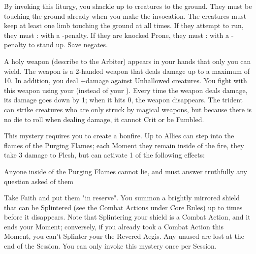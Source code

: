 {By invoking this liturgy, you shackle up to \DICE creatures to the ground.  They must be touching the ground already when you make the invocation.  The creatures must keep at least one limb touching the ground at all times.  If they attempt to run, they must \RB : \DEX with a -\DICE penalty.  If they are knocked Prone, they must \RB : \VIG with a -\DICE penalty to stand up.  Save negates.

\MYSTERY [
  Name = Holy Weapon,
  Link = arcana-mystery-holy-weapon,
  Paradigm = Force,
  Save = n/a,
  Duration = Session,
  Target = Self
]

A holy weapon (describe to the Arbiter) appears in your hands that only you can wield.  The weapon is a 2-handed weapon that deals \DICE damage up to a maximum of 10.  In addition, you deal +\DICE damage against Unhallowed creatures. You fight with this weapon using your \FOC (instead of your \VIG). Every time the weapon deals damage, its damage goes down by 1; when it hits 0, the weapon disappears.  The trident can strike creatures who are only struck by magical weapons, but because there is no die to roll when dealing damage, it cannot Crit or be Fumbled. 

\MYSTERY [
  Name = Purging Fire,
  Link = arcana-mystery-purging-fire,
  Paradigm = Elements,
  Save = N,
  Duration = \SUM Minutes,
  Target = See Below
]

This mystery requires you to create a bonfire.  Up to \DICE Allies can step into the flames of the Purging Flames; each Moment they remain inside of the fire, they take 3 damage to Flesh, but can activate 1 of the following effects:


Anyone inside of the Purging Flames cannot lie, and must answer truthfully any question asked of them


\MYSTERY [
  Name = Revered Aegis,
  Link = arcana-mystery-revered-aegis,
  Paradigm = Force,
  Save = n/a,
  Duration = Session,
  Target = Self
]

Take \DICE Faith and put them "in reserve".  You summon a brightly mirrored shield that can be Splintered (see the Combat Actions under Core Rules) up to \DICE times before it disappears.  Note that Splintering your shield is a Combat Action, and it ends your Moment; conversely, if you already took a Combat Action this Moment, you can’t Splinter your the Revered Aegis.  Any unused \DICE are lost at the end of the Session.  You can only invoke this mystery once per Session.

}

